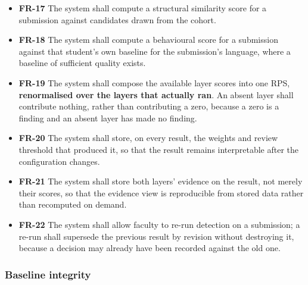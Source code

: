 \begin{itemize}
\tightlist
\item
  \textbf{FR-17} The system shall compute a structural similarity score
  for a submission against candidates drawn from the cohort.
\item
  \textbf{FR-18} The system shall compute a behavioural score for a
  submission against that student's own baseline for the submission's
  language, where a baseline of sufficient quality exists.
\item
  \textbf{FR-19} The system shall compose the available layer scores
  into one RPS, \textbf{renormalised over the layers that actually ran}.
  An absent layer shall contribute nothing, rather than contributing a
  zero, because a zero is a finding and an absent layer has made no
  finding.
\item
  \textbf{FR-20} The system shall store, on every result, the weights
  and review threshold that produced it, so that the result remains
  interpretable after the configuration changes.
\item
  \textbf{FR-21} The system shall store both layers' evidence on the
  result, not merely their scores, so that the evidence view is
  reproducible from stored data rather than recomputed on demand.
\item
  \textbf{FR-22} The system shall allow faculty to re-run detection on a
  submission; a re-run shall supersede the previous result by revision
  without destroying it, because a decision may already have been
  recorded against the old one.
\end{itemize}

\hypertarget{baseline-integrity}{%
\subsubsection{Baseline integrity}\label{baseline-integrity}}

